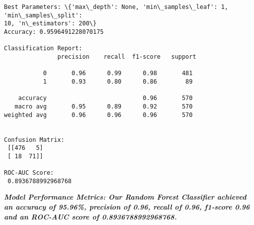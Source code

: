 \documentclass[11pt]{article}
\begin{document}
    \begin{Verbatim}[commandchars=\\\{\}]
Best Parameters: \{'max\_depth': None, 'min\_samples\_leaf': 1, 'min\_samples\_split':
10, 'n\_estimators': 200\}
Accuracy: 0.9596491228070175

Classification Report:
               precision    recall  f1-score   support

           0       0.96      0.99      0.98       481
           1       0.93      0.80      0.86        89

    accuracy                           0.96       570
   macro avg       0.95      0.89      0.92       570
weighted avg       0.96      0.96      0.96       570


Confusion Matrix:
 [[476   5]
 [ 18  71]]

ROC-AUC Score:
 0.8936788992968768
    \end{Verbatim}

    \textbf{\emph{Model Performance Metrics: Our Random Forest Classifier
achieved an accuracy of 95.96\%, precision of 0.96, recall of 0.96,
f1-score 0.96 and an ROC-AUC score of 0.8936788992968768.}}
\end{document}

